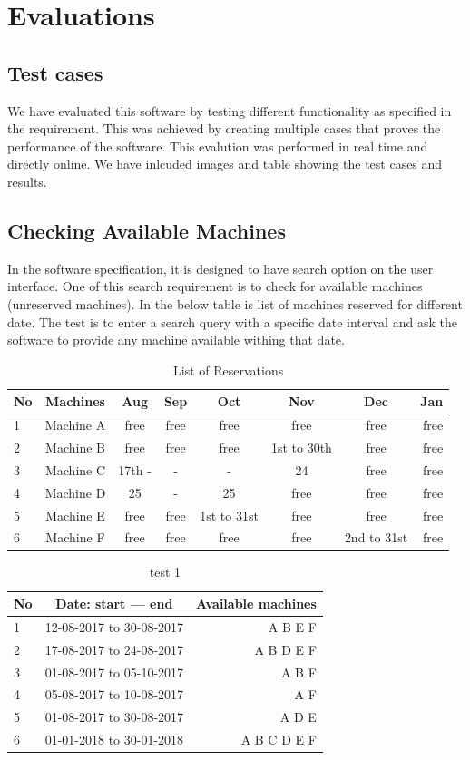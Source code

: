 \chapter{Evaluations} 
\label{chap:refs}
\label{chap:ch5_abbr}
\section{Test cases}
We have evaluated this software by testing different functionality as specified in the requirement. This was achieved by creating multiple cases that proves the performance of the software. This evalution was performed in real time and directly online. We have inlcuded images and table showing the test cases and results. 
\section*{Checking Available Machines}
In the software specification, it is designed to have search option on the user interface. One of this search requirement is to check for available machines (unreserved machines). In the below table is list of machines reserved for different date. The test is to enter a search query with a specific date interval and ask the software to provide any machine available withing that date.

\begin{table}[h!]
  \centering
  \label{tab:table1}
  \begin{tabular}{l|c||c||c||c||c||c||r}
    No & Machines & Aug & Sep & Oct & Nov & Dec & Jan \\
    \hline
    1 &Machine A & free & free & free & free & free & free\\
    2 &Machine B & free & free & free & 1st to 30th & free & free\\
    3 &Machine C & 17th - & - & - & 24 & free & free\\
    4 &Machine D & 25 & - & 25 & free & free & free\\
    5 &Machine E & free & free & 1st to 31st & free & free & free\\
    6 &Machine F & free & free & free & free & 2nd to 31st & free\\
  \end{tabular}
  \caption{List of Reservations}
\end{table}

\begin{table}[h!]
  \centering
  \label{tab:table1}
  \begin{tabular}{l|c||r}
    No & Date: start --- end & Available machines\\
    \hline
    1 &12-08-2017 to 30-08-2017  & A B E F \\
    2 &17-08-2017 to 24-08-2017  & A B D E F\\
    3 &01-08-2017 to 05-10-2017  & A B F \\
    4 &05-08-2017 to 10-08-2017  & A F \\
    5 &01-08-2017 to 30-08-2017  & A D E  \\
    6 &01-01-2018 to 30-01-2018  & A B C D E F \\
  \end{tabular}
  \caption{test 1}
\end{table}

